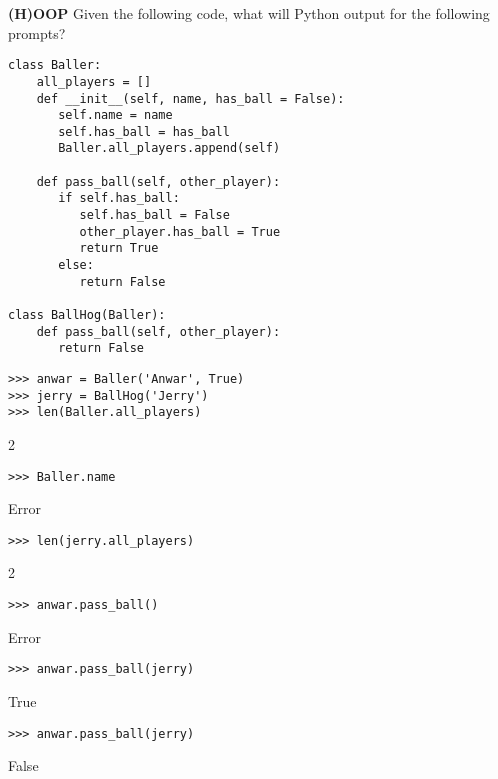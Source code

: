 \question \textbf{(H)OOP} \newline
Given the following code, what will Python output for the following prompts?

\begin{lstlisting}
class Baller:
    all_players = []
    def __init__(self, name, has_ball = False):
       self.name = name
       self.has_ball = has_ball
       Baller.all_players.append(self)

    def pass_ball(self, other_player):
       if self.has_ball:
          self.has_ball = False
          other_player.has_ball = True
          return True
       else:
          return False

class BallHog(Baller):
    def pass_ball(self, other_player):
       return False

\end{lstlisting}

\begin{lstlisting}
>>> anwar = Baller('Anwar', True)
>>> jerry = BallHog('Jerry')
>>> len(Baller.all_players)
\end{lstlisting}
\begin{solution}[.2in]
2
\end{solution}

\begin{lstlisting}
>>> Baller.name
\end{lstlisting}
\begin{solution}[.2in]
Error
\end{solution}

\begin{lstlisting}
>>> len(jerry.all_players)
\end{lstlisting}
\begin{solution}[.2in]
2
\end{solution}

\begin{lstlisting}
>>> anwar.pass_ball()
\end{lstlisting}
\begin{solution}[.2in]
Error
\end{solution}

\begin{lstlisting}
>>> anwar.pass_ball(jerry)
\end{lstlisting}
\begin{solution}[.2in]
True
\end{solution}

\begin{lstlisting}
>>> anwar.pass_ball(jerry)
\end{lstlisting}
\begin{solution}[.2in]
False
\end{solution}

